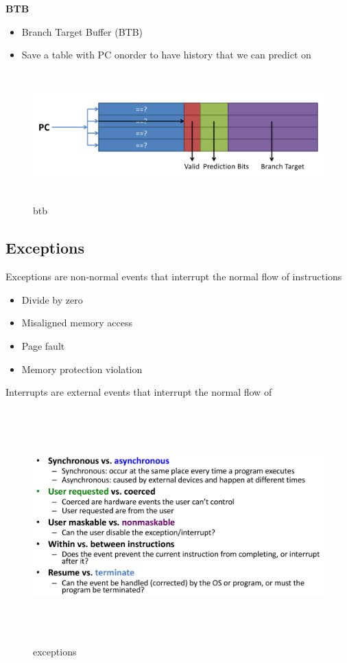 \newpage

\textbf{BTB}
\begin{itemize}
\item  Branch Target Buffer (BTB)
\item  Save a table with PC onorder to have history that we can predict on
\end{itemize}

\begin{figure}[h]
    \vspace{10mm}
    \centering
    \includegraphics[width=16cm, height=5cm]{image/btb.png} 
    \caption{btb}
\end{figure}


\newpage

\subsection{Exceptions}
Exceptions are non-normal events that interrupt the normal flow of instructions
\begin{itemize}
\item  Divide by zero
\item  Misaligned memory access
\item  Page fault
\item  Memory protection violation
\end{itemize}

Interrupts are external events that interrupt the normal flow of 

\begin{figure}[h]
    \vspace{10mm}
    \centering
    \includegraphics[width=16cm, height=9cm]{image/exceptions.png} 
    \caption{exceptions}
\end{figure}


